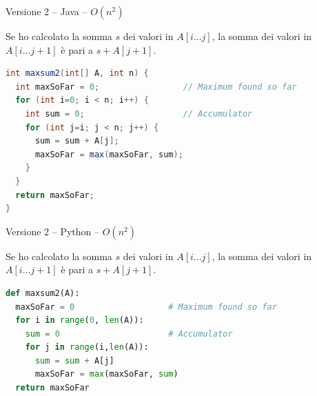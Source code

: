 \begin{frame}[fragile]{Versione 2 -- Java -- $O(n^2)$}

\vspace{-6pt}
\begin{myboxtitle}[Ottimizzazione]
Se ho calcolato la somma $s$ dei valori in $A[i \ldots j]$, la somma
dei valori in $A[i \ldots j+1]$ è pari a $s+A[j+1]$. 
\end{myboxtitle}



\begin{lstlisting}[language=java]
int maxsum2(int[] A, int n) {
  int maxSoFar = 0;                 // Maximum found so far
  for (int i=0; i < n; i++) {
    int sum = 0;                    // Accumulator
    for (int j=i; j < n; j++) {
      sum = sum + A[j];
      maxSoFar = max(maxSoFar, sum);
    }
  }
  return maxSoFar;
}
\end{lstlisting}

\end{frame}


\begin{frame}[fragile]{Versione 2 -- Python -- $O(n^2)$}

\vspace{-6pt}
\begin{myboxtitle}[Ottimizzazione]
Se ho calcolato la somma $s$ dei valori in $A[i \ldots j]$, la somma
dei valori in $A[i \ldots j+1]$ è pari a $s+A[j+1]$. 
\end{myboxtitle}

\begin{lstlisting}[language=python]
def maxsum2(A):
  maxSoFar = 0                   # Maximum found so far
  for i in range(0, len(A)):
    sum = 0                      # Accumulator
    for j in range(i,len(A)):
      sum = sum + A[j]
      maxSoFar = max(maxSoFar, sum)
  return maxSoFar
\end{lstlisting}


\end{frame}


